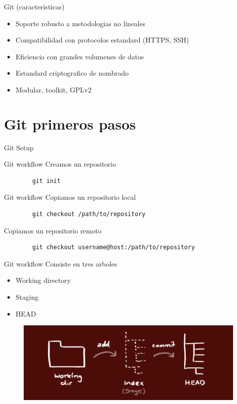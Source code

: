 \documentclass{beamer}
\begin{document}
\begin{frame}{Git (caracteristicas)}
	\begin{itemize}
		\item Soporte robusto a metodologias no lineales
		\item Compatibilidad con protocolos estandard (HTTPS, SSH)
		\item Eficiencia con grandes volumenes de datos
		\item Estandard criptografico de nombrado
		\item Modular, toolkit, GPLv2
	\end{itemize}
\end{frame}

\section{Git primeros pasos}
\begin{frame}{Git}
	Setup
\end{frame}

\begin{frame}[fragile]{Git workflow}
	Creamos un repositorio
	\begin{verbatim}
		git init
	\end{verbatim}
\end{frame}

\begin{frame}[fragile]{Git workflow}
	Copiamos un repositorio local
	\begin{verbatim}
		git checkout /path/to/repository
	\end{verbatim}
	
	Copiamos un repositorio remoto
	\begin{verbatim}
		git checkout username@host:/path/to/repository
	\end{verbatim}
\end{frame}

\begin{frame}[fragile]{Git workflow}
	Consiste en tres arboles
	\begin{itemize}
	\item Working directory
	\item Staging
	\item HEAD
	\end{itemize}
	\begin{figure}
		\centering
		\includegraphics[width=0.7\linewidth]{Images/trees}
	\end{figure}
\end{frame}
\end{document}

